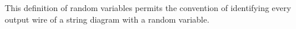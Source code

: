 This definition of random variables permits the convention of identifying every output wire of a string diagram with a random variable. 







